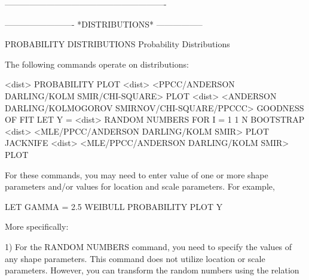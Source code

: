 ----------------------------------------------------------

































































-------------------------  *DISTRIBUTIONS*  -----------------
 
PROBABILITY DISTRIBUTIONS
Probability Distributions
 
The following commands operate on distributions:

    <dist> PROBABILITY PLOT
    <dist> <PPCC/ANDERSON DARLING/KOLM SMIR/CHI-SQUARE> PLOT
    <dist> <ANDERSON DARLING/KOLMOGOROV SMIRNOV/CHI-SQUARE/PPCCC>
           GOODNESS OF FIT
    LET Y = <dist> RANDOM NUMBERS FOR I = 1 1 N
    BOOTSTRAP <dist> <MLE/PPCC/ANDERSON DARLING/KOLM SMIR> PLOT
    JACKNIFE <dist> <MLE/PPCC/ANDERSON DARLING/KOLM SMIR> PLOT

For these commands, you may need to enter value of one or more
shape parameters and/or values for location and scale parameters.
For example,

   LET GAMMA = 2.5
   WEIBULL PROBABILITY PLOT Y

More specifically:

   1) For the RANDOM NUMBERS command, you need to specify the values
      of any shape parameters.  This command does not utilize location
      or scale parameters.  However, you can transform the random
      numbers using the relation

